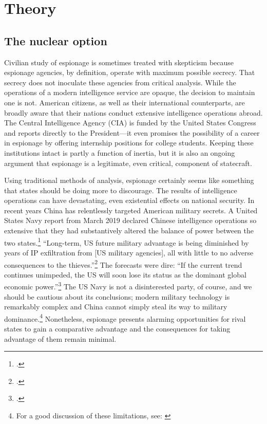 \documentclass[12pt]{extarticle}
\begin{document}
\section{Theory}
\subsection{The nuclear option}

Civilian study of espionage is sometimes treated with skepticism because espionage agencies, by definition, operate with maximum possible secrecy. That secrecy does not inoculate these agencies from critical analysis. While the operations of a modern intelligence service are opaque, the decision to maintain one is not. American citizens, as well as their international counterparts, are broadly aware that their nations conduct extensive intelligence operations abroad. The Central Intelligence Agency (CIA) is funded by the United States Congress and reports directly to the President---it even promises the possibility of a career in espionage by offering internship positions for college students. Keeping these institutions intact is partly a function of inertia, but it is also an ongoing argument that espionage is a legitimate, even critical, component of statecraft.

Using traditional methods of analysis, espionage certainly seems like something that states should be doing more to discourage. The results of intelligence operations can have devastating, even existential effects on national security. In recent years China has relentlessly targeted American military secrets. A United States Navy report from March 2019 declared Chinese intelligence operations so extensive that they had substantively altered the balance of power between the two states.\footcite{lubold_navy_2019} \enquote{Long-term, US future military advantage is being diminished by years of IP exfiltration from [US military agencies], all with little to no adverse consequences to the thieves.}\footcite[6]{bayer_cybersecurity_2019} The forecasts were dire: \enquote{If the current trend continues unimpeded, the US will soon lose its status as the dominant global economic power.}\footcite[5]{bayer_cybersecurity_2019} The US Navy is not a disinterested party, of course, and we should be cautious about its conclusions; modern military technology is remarkably complex and China cannot simply steal its way to military dominance.\footnote{For a good discussion of these limitations, see: \cite{gilli_why_2019}} Nonetheless, espionage presents alarming opportunities for rival states to gain a comparative advantage and the consequences for taking advantage of them remain minimal.
\end{document}
